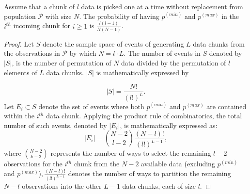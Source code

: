 \documentclass[a4paper,fleqn]{cas-dc}
\begin{document}
\begin{theorem}
Assume that a chunk of $l$ data is picked one at a time without replacement from population $\mathcal{P}$ with size $N$.
The probability of having $p^{(min)}$ and $p^{(max)}$ in the $i^{th}$ incoming chunk  for $i \geq 1$ is 
$\frac{l(l-1)}{N(N-1)}$.
\begin{proof}
Let $S$ denote the sample space of events of generating $L$ data chunks from the observations in $\mathcal{P}$ by which $N=l\cdot L$.%
The number of events in $S$ denoted by $|S|$, is the number of permutation of $N$ data divided by the permutation of $l$ elements of $L$ data chunks.  $|S|$ is mathematically expressed by

\begin{equation}
|S|=\frac{N!}{(l!)^L}. \label{eq:S}
\end{equation}
Let $E_i\subset S$ denote the set of events where both $p^{(min)}$ and $p^{(max)}$ are contained within the $i^{th}$ data chunk. Applying the product rule of combinatorics, the total number of such events, denoted by $|E_i|$, is mathematically expressed as: 
\begin{equation}
|E_i|=\binom{N-2}{l-2}\frac{(N-l)!}{(l!)^{L-1}},\label{eq:E}
\end{equation}
where $\binom{N-2}{k-2}$ represents the number of ways to select the remaining $l-2$ observations for the $i^{th}$ chunk from the $N-2$ available data (excluding $p^{(min)}$ and $p^{(max)}$)$, \frac{(N-l)!}{(l!)^{L-1}}$ denotes the number of ways to partition the remaining $N-l$ observations into the other $L-1$ data chunks, each of size $l$.



\end{proof}
\end{theorem}
\end{document}

